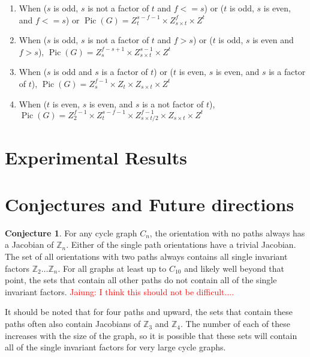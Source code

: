 \documentclass[11pt,reqno]{amsart}
\DeclareMathOperator{\Pic}{Pic}
\theoremstyle{definition}
\newtheorem{conj}[mydef]{Conjecture}
\theoremstyle{plain}
\begin{document}
		\begin{enumerate}
			\item When ($s$ is odd, $s$ is not a factor of $t$ and $f <= s$) or
					($t$ is odd, $s$ is even, and $f <= s$) or
				$\Pic(G) = Z_{t}^{s-f-1} \times Z_{s \times t}^{f} \times Z^t$

			\item When ($s$ is odd, $s$ is not a factor of $t$ and $f > s$) or
					($t$ is odd, $s$ is even and $f > s$),
				$\Pic(G) = Z_{s}^{f-s+1} \times Z_{s \times t}^{s-1} \times Z^t$

			\item When ($s$ is odd and $s$ is a factor of $t$) or ($t$ is even, $s$ is even, and $s$ is a factor of $t$),
				$\Pic(G) = Z_{s}^{f-1} \times Z_{t} \times Z_{s \times t} \times Z^t$

			\item When ($t$ is even, $s$ is even, and $s$ is a not factor of $t$),
				$\Pic(G) = Z_{2}^{f-1} \times Z_{t}^{s-f-1} \times Z_{s \times t/2}^{f-1} \times Z_{s \times t} \times Z^t$
		\end{enumerate}

\section{Experimental Results}

\section{Conjectures and Future directions}

	\begin{conj}
	For any cycle graph $C_n$, the orientation with no paths always has a Jacobian of $\mathbb{Z}_n$.
	Either of the single path orientations have a trivial Jacobian.
	The set of all orientations with two paths always contains all single invariant factors
	$\mathbb{Z}_2\dots\mathbb{Z}_n$.  For all graphs at least up to $C_{10}$ and likely well beyond that
	point, the sets that contain all other paths do not contain all of the single invariant factors. \textcolor{red}{Jaiung: I think this should not be difficult....}
\end{conj}

It should be noted that for four paths and upward, the sets that contain these paths often also contain
Jacobians of $\mathbb{Z}_3$ and $\mathbb{Z}_4$.  The number of each of these increases with the size of the
graph, so it is possible that these sets will contain all of the single invariant factors for very
large cycle graphs.



\end{document}
